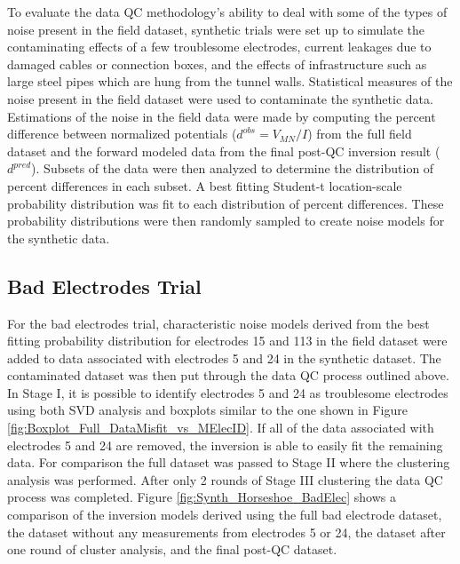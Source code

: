 \documentclass[final,authoryear,5p,times,twocolumn]{elsarticle}
\begin{document}
To evaluate the data QC methodology's ability to deal with some of the types of noise present in the field dataset, synthetic trials were set up to simulate the contaminating effects of a few troublesome electrodes, current leakages due to damaged cables or connection boxes, and the effects of infrastructure such as large steel pipes which are hung from the tunnel walls. Statistical measures of the noise present in the field dataset were used to contaminate the synthetic data. Estimations of the noise in the field data were made by computing the percent difference between normalized potentials ($d^{obs} = V_{MN}/I$) from the full field dataset and the forward modeled data from the final post-QC inversion result ($d^{pred}$). Subsets of the data were then analyzed to determine the distribution of percent differences in each subset. A best fitting Student-t location-scale probability distribution was fit to each distribution of percent differences. These probability distributions were then randomly sampled to create noise models for the synthetic data.

\subsection{Bad Electrodes Trial}

For the bad electrodes trial, characteristic noise models derived from the best fitting probability distribution for electrodes 15 and 113 in the field dataset were added to data associated with electrodes 5 and 24 in the synthetic dataset. The contaminated dataset was then put through the data QC process outlined above. In Stage I, it is possible to identify electrodes 5 and 24 as troublesome electrodes using both SVD analysis and boxplots similar to the one shown in Figure \ref{fig:Boxplot_Full_DataMisfit_vs_MElecID}. If all of the data associated with electrodes 5 and 24 are removed, the inversion is able to easily fit the remaining data. For comparison the full dataset was passed to Stage II where the clustering analysis was performed. After only 2 rounds of Stage III clustering the data QC process was completed. Figure \ref{fig:Synth_Horseshoe_BadElec} shows a comparison of the inversion models derived using the full bad electrode dataset, the dataset without any measurements from electrodes 5 or 24, the dataset after one round of cluster analysis, and the final post-QC dataset.
\end{document}
